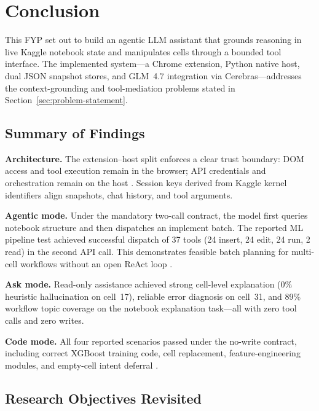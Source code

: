 \chapter{Conclusion}
\label{cha:conclusion}

This FYP set out to build an agentic \ac{LLM} assistant that grounds reasoning in live Kaggle notebook state and manipulates cells through a bounded tool interface. The implemented system---a Chrome extension, Python native host, dual JSON snapshot stores, and GLM~4.7 integration via Cerebras---addresses the context-grounding and tool-mediation problems stated in Section~\ref{sec:problem-statement}.

\section{Summary of Findings}

\textbf{Architecture.} The extension--host split enforces a clear trust boundary: \ac{DOM} access and tool execution remain in the browser; \ac{API} credentials and orchestration remain on the host \parencite{chasins2018roussillon,qin2024toolllm}. Session keys derived from Kaggle kernel identifiers align snapshots, chat history, and tool arguments.

\textbf{Agentic mode.} Under the mandatory two-call contract, the model first queries notebook structure and then dispatches an implement batch. The reported ML pipeline test achieved successful dispatch of 37 tools (24 insert, 24 edit, 24 run, 2 read) in the second \ac{API} call. This demonstrates feasible batch planning for multi-cell workflows without an open ReAct loop \parencite{yao2023react}.

\textbf{Ask mode.} Read-only assistance achieved strong cell-level explanation (0\% heuristic hallucination on cell~17), reliable error diagnosis on cell~31, and 89\% workflow topic coverage on the notebook explanation task---all with zero tool calls and zero writes.

\textbf{Code mode.} All four reported scenarios passed under the no-write contract, including correct XGBoost training code, cell replacement, feature-engineering modules, and empty-cell intent deferral \parencite{mcnutt2023notebookassistants}.

\section{Research Objectives Revisited}

